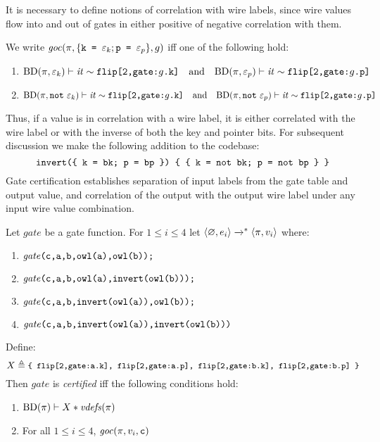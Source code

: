 It is necessary to define notions of correlation with wire
labels, since wire values flow into and out of gates in either
positive of negative correlation with them.
\begin{definition}
  \label{definition-gc}
  We write $\mathit{goc}(\pi,\{ \texttt{k = }\varepsilon_{k}; \texttt{p = }\varepsilon_{p} \},g)$ iff one of the
  following hold:
  \begin{enumerate}[\hspace{5mm}i.]
  \item $\mathrm{BD}(\pi,\varepsilon_k) \vdash \mathit{it} \sim \texttt{flip[2,gate:}g\texttt{.k]}\quad \text{and} \quad
    \mathrm{BD}(\pi,\varepsilon_p) \vdash \mathit{it} \sim \texttt{flip[2,gate:}g\texttt{.p]}$
  \item $\vc{\progtt(\prog,\enot\ \be_k)}{\itv}{\ttt{flip[2,gate:}g\ttt{.k]}}\quad \text{and}\quad
    \vc{\progtt(\prog,\enot\ \be_p)}{\itv}{\ttt{flip[2,gate:}g\ttt{.p]}}$
  \end{enumerate}
\end{definition}
Thus, if a value is in correlation with a wire label, it is either
correlated with the wire label or with the inverse of both the key and
pointer bits. For subsequent discussion we make the following addition
to the codebase:
$$
\texttt{invert(\{ k = bk; p = bp \}) \{ \{ k = not bk; p = not bp \} \}}
$$
Gate certification establishes separation of input labels from the
gate table and output value, and correlation of the output with
the output wire label under any input wire value combination.
\begin{definition}
  \label{definition-ygcgate-certification}
  Let $\mathit{gate}$ be a gate function.
  For $1 \le i \le 4$  let
  $
  \langle \varnothing,e_i \rangle\xrightarrow{}^{*}\langle \pi,v_i \rangle
  $
  where:
  \begin{enumerate}
    \item $\mathit{gate}\texttt{(c,a,b,owl(a),owl(b));}$
    \item $\mathit{gate}\texttt{(c,a,b,owl(a),invert(owl(b)));}$
    \item $\mathit{gate}\texttt{(c,a,b,invert(owl(a)),owl(b));}$
    \item $\mathit{gate}\texttt{(c,a,b,invert(owl(a)),invert(owl(b)))}$
  \end{enumerate}
  Define:
  $${\small X \triangleq \texttt{\{ flip[2,gate:a.k], flip[2,gate:a.p], flip[2,gate:b.k], flip[2,gate:b.p] \}}}$$
  Then $\mathit{gate}$ is \emph{certified} iff the following conditions hold:
  \begin{enumerate}[\hspace{5mm}i.]
  \item $\mathrm{BD}(\pi) \vdash X * \mathit{vdefs}(\pi)$
  \item For all $1 \le i \le 4$, $\mathit{goc}(\pi,v_i,\texttt{c})$
  \end{enumerate}
\end{definition}
